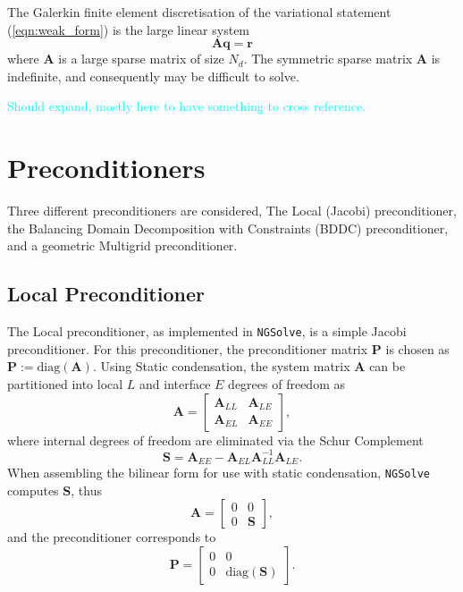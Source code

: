 \documentclass[a4paper,12]{elsarticle}
\theoremstyle{definition}
\begin{document}
The Galerkin finite element discretisation of the variational statement (\ref{eqn:weak_form}) is the large linear system
\begin{equation}\label{eqn:lse}
\mathbf{A}\mathbf{q} = \mathbf{r}
\end{equation}
where $\mathbf{A}$ is a large sparse matrix of size $N_d$. The symmetric sparse matrix $\mathbf{A}$ is indefinite, and consequently may be difficult to solve.

\textcolor{cyan}{Should expand, mostly here to have something to cross reference.}


\section{Preconditioners}
Three different preconditioners are considered, The Local (Jacobi) preconditioner, the Balancing Domain Decomposition with Constraints (BDDC) preconditioner, and a geometric Multigrid preconditioner.

\subsection{Local Preconditioner}
The Local preconditioner, as implemented in \texttt{NGSolve}, is a simple Jacobi preconditioner. For this preconditioner, the preconditioner matrix $\mathbf{P}$ is chosen as $\mathbf{P} := \mathrm{diag}(\mathbf{A})$. Using Static condensation, the system matrix $\mathbf{A}$ can be partitioned into local $L$ and interface $E$ degrees of freedom as 
%
\begin{equation*}
\mathbf{A} = \begin{bmatrix}
\mathbf{A}_{LL} & \mathbf{A}_{LE} \\ \mathbf{A}_{EL} & \mathbf{A}_{EE}
\end{bmatrix},
\end{equation*}
%
where internal degrees of freedom are eliminated via the Schur Complement~\cite{Guyan1965} 
\begin{equation*}
\mathbf{S} = \mathbf{A}_{EE} - \mathbf{A}_{EL} \mathbf{A}_{LL}^{-1} \mathbf{A}_{LE}.
\end{equation*}
%
When assembling the bilinear form for use with static condensation, \texttt{NGSolve} computes $\mathbf{S}$, thus
%
\begin{equation*}
\mathbf{A} = \begin{bmatrix}
0 &0 \\ 0 & \mathbf{S}
\end{bmatrix},
\end{equation*}
%
and the preconditioner corresponds to
\begin{equation*}
\mathbf{P} = \begin{bmatrix}
0 &0 \\ 0 & \mathrm{diag}(\mathbf{S})
\end{bmatrix}.
\end{equation*}
\end{document}
